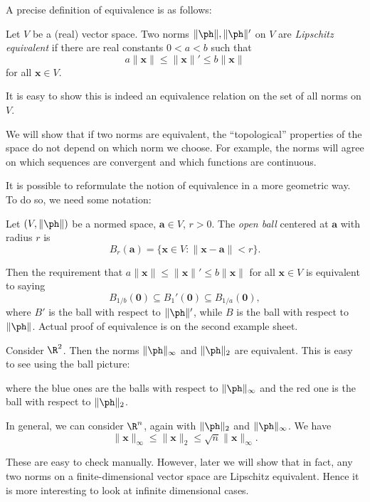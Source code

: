 \documentclass[a4paper]{article}
\begin{document}
A precise definition of equivalence is as follows:
\begin{defi}
  Let $V$ be a (real) vector space. Two norms $\|\ph \|, \|\ph \|'$ on $V$ are \emph{Lipschitz equivalent} if there are real constants $0 < a < b$ such that
  \[
    a \|\mathbf{x}\| \leq \|\mathbf{x}\|' \leq b\|\mathbf{x}\|
  \]
  for all $\mathbf{x} \in V$.

  It is easy to show this is indeed an equivalence relation on the set of all norms on $V$.
\end{defi}
We will show that if two norms are equivalent, the ``topological'' properties of the space do not depend on which norm we choose. For example, the norms will agree on which sequences are convergent and which functions are continuous.

It is possible to reformulate the notion of equivalence in a more geometric way. To do so, we need some notation:
\begin{defi}
  Let $(V, \|\ph \|)$ be a normed space, $\mathbf{a} \in V$, $r > 0$. The \emph{open ball} centered at $\mathbf{a}$ with radius $r$ is
  \[
    B_r(\mathbf{a}) = \{\mathbf{x}\in V: \|\mathbf{x} - \mathbf{a}\| < r\}.
  \]
\end{defi}
Then the requirement that $a\|\mathbf{x}\| \leq \|\mathbf{x}\|' \leq b\|\mathbf{x}\|$ for all $\mathbf{x}\in V$ is equivalent to saying
\[
  B_{1/b} (\mathbf{0}) \subseteq B_1'(\mathbf{0}) \subseteq B_{1/a}(\mathbf{0}),
\]
where $B'$ is the ball with respect to $\|\ph \|'$, while $B$ is the ball with respect to $\|\ph \|$. Actual proof of equivalence is on the second example sheet.

\begin{eg}
  Consider $\R^2$. Then the norms $\|\ph \|_\infty$ and $\|\ph \|_2$ are equivalent. This is easy to see using the ball picture:
  \begin{center}
  \end{center}
  where the blue ones are the balls with respect to $\|\ph \|_\infty$ and the red one is the ball with respect to $\|\ph \|_2$.

  In general, we can consider $\R^n$, again with $\|\ph \|_2$ and $\|\ph \|_\infty$. We have
  \[
    \|\mathbf{x}\|_\infty \leq \|\mathbf{x}\|_2 \leq \sqrt{n}\|\mathbf{x}\|_\infty.
  \]
\end{eg}
These are easy to check manually. However, later we will show that in fact, any two norms on a finite-dimensional vector space are Lipschitz equivalent. Hence it is more interesting to look at infinite dimensional cases.
\end{document}
